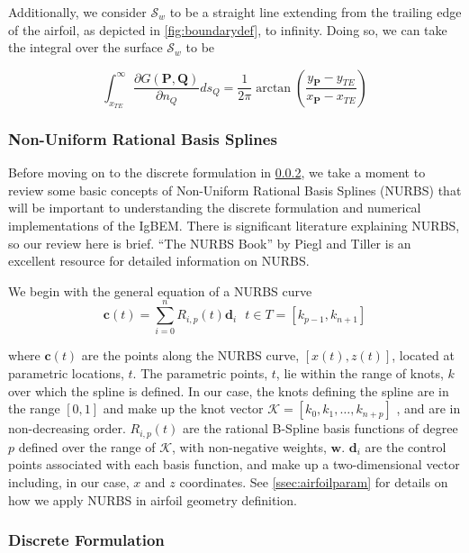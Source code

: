 Additionally, we consider $\mathcal{S}_w$ to be a straight line extending from the trailing edge of the airfoil, as depicted in \cref{fig:boundarydef}, to infinity. Doing so, we can take the integral over the surface $\mathcal{S}_w$ to be

\begin{equation}
\label{eqn:wakeintegral}
\int_{x_{TE}}^{\infty} \frac{\partial G (\mathbf{P},\mathbf{Q})}{\partial n_Q} ds_Q = \frac{1}{2\pi} \arctan\left( \frac{y_{\mathbf{P}} - y_{TE}}{x_{\mathbf{P}}-x_{TE}} \right)
\end{equation}


\subsubsection{Non-Uniform Rational Basis Splines}
\label{sssec:nurbs}
Before moving on to the discrete formulation in \cref{sssec:discform}, we take a moment to review some basic concepts of Non-Uniform Rational Basis Splines (NURBS) that will be important to understanding the discrete formulation and numerical implementations of the IgBEM. There is significant literature explaining NURBS, so our review here is brief. ``The NURBS Book'' by Piegl and Tiller is an excellent resource for detailed information on NURBS.\cite{Piegl1997The-NURBS-Book}

We begin with the general equation of a NURBS curve
\begin{equation}
\mathbf{c}(t) = \sum_{i=0}^n R_{i,p}(t) \mathbf{d}_i ~~~t\in T = [k_{p-1},k_{n+1}]
\end{equation}

where $\mathbf{c}(t)$ are the points along the NURBS curve, $[x(t),z(t)]$, located at parametric locations, $t$. The parametric points, $t$, lie within the range of knots, $k$ over which the spline is defined. In our case, the knots defining the spline are in the range $[0,1]$ and make up the knot vector $\mathbf{\mathcal{K}} = [k_0,k_1,\ldots,k_{n+p}]$ , and are in non-decreasing order. $R_{i,p}(t)$ are the rational B-Spline basis functions of degree $p$ defined over the range of $\mathcal{K}$, with non-negative weights, $\mathbf{w}$. $\mathbf{d}_i$ are the control points associated with each basis function, and make up a two-dimensional vector including, in our case, $x$ and $z$ coordinates. See \cref{ssec:airfoilparam} for details on how we apply NURBS in airfoil geometry definition.


\subsubsection{Discrete Formulation}
\label{sssec:discform}

